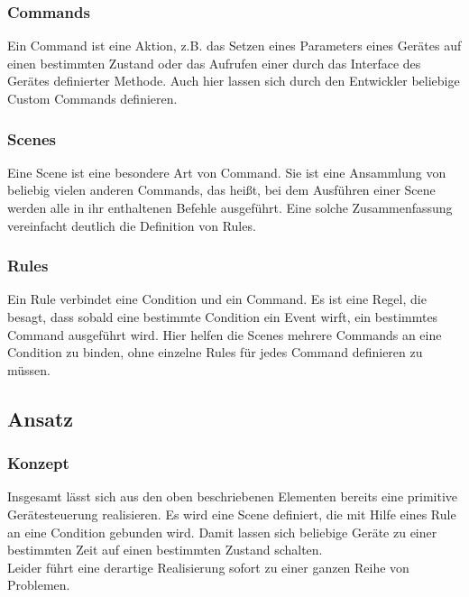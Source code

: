 \subsubsection{Commands}
Ein Command ist eine Aktion, z.B. das Setzen eines Parameters eines Gerätes auf einen bestimmten Zustand oder das Aufrufen einer durch das Interface des Gerätes definierter Methode.
Auch hier lassen sich durch den Entwickler beliebige Custom Commands definieren.

\subsubsection{Scenes}
Eine Scene ist eine besondere Art von Command. Sie ist eine Ansammlung von beliebig vielen anderen Commands, das heißt, bei dem Ausführen einer Scene werden alle in ihr enthaltenen Befehle ausgeführt. Eine solche Zusammenfassung vereinfacht deutlich die Definition von Rules.

\subsubsection{Rules}
Ein Rule verbindet eine Condition und ein Command. Es ist eine Regel, die besagt, dass sobald eine bestimmte Condition ein Event wirft, ein bestimmtes Command ausgeführt wird. Hier helfen die Scenes mehrere Commands an eine Condition zu binden, ohne einzelne Rules für jedes Command definieren zu müssen.


\subsection{Ansatz}
\subsubsection{Konzept}
Insgesamt lässt sich aus den oben beschriebenen Elementen bereits eine primitive Gerätesteuerung realisieren. Es wird eine Scene definiert, die mit Hilfe eines Rule an eine Condition gebunden wird. Damit lassen sich beliebige Geräte zu einer bestimmten Zeit auf einen bestimmten Zustand schalten.\\
Leider führt eine derartige Realisierung sofort zu einer ganzen Reihe von Problemen.

